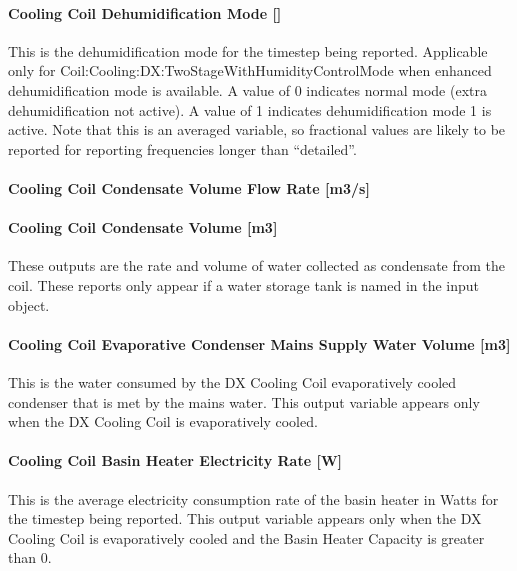 \paragraph{Cooling Coil Dehumidification Mode {[]}}\label{cooling-coil-dehumidification-mode}

This is the dehumidification mode for the timestep being reported. Applicable only for Coil:Cooling:DX:TwoStageWithHumidityControlMode when enhanced dehumidification mode is available. A value of 0 indicates normal mode (extra dehumidification not active). A value of 1 indicates dehumidification mode 1 is active. Note that this is an averaged variable, so fractional values are likely to be reported for reporting frequencies longer than ``detailed''.

\paragraph{Cooling Coil Condensate Volume Flow Rate {[}m3/s{]}}\label{cooling-coil-condensate-volume-flow-rate-m3s-4}

\paragraph{Cooling Coil Condensate Volume {[}m3{]}}\label{cooling-coil-condensate-volume-m3-4}

These outputs are the rate and volume of water collected as condensate from the coil. These reports only appear if a water storage tank is named in the input object.

\paragraph{Cooling Coil Evaporative Condenser Mains Supply Water Volume {[}m3{]}}\label{cooling-coil-evaporative-condenser-mains-supply-water-volume-m3-1}

This is the water consumed by the DX Cooling Coil evaporatively cooled condenser that is met by the mains water. This output variable appears only when the DX Cooling Coil is evaporatively cooled.

\paragraph{Cooling Coil Basin Heater Electricity Rate {[}W{]}}\label{cooling-coil-basin-heater-electric-power-w}

This is the average electricity consumption rate of the basin heater in Watts for the timestep being reported. This output variable appears only when the DX Cooling Coil is evaporatively cooled and the Basin Heater Capacity is greater than 0.


